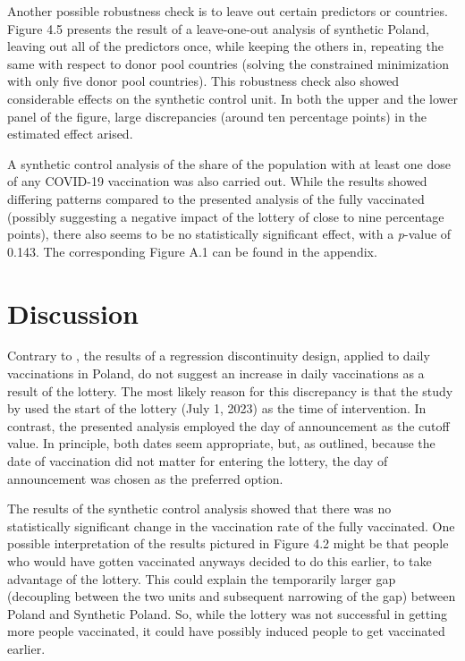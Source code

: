 \documentclass{scrbook}
\begin{document}
Another possible robustness check is to leave out certain predictors or
countries. Figure 4.5 presents the result of a leave-one-out analysis of
synthetic Poland, leaving out all of the predictors once, while keeping
the others in, repeating the same with respect to donor pool countries
(solving the constrained minimization with only five donor pool
countries). This robustness check also showed considerable effects on
the synthetic control unit. In both the upper and the lower panel of the
figure, large discrepancies (around ten percentage points) in the
estimated effect arised.

A synthetic control analysis of the share of the population with at
least one dose of any COVID-19 vaccination was also carried out. While
the results showed differing patterns compared to the presented analysis
of the fully vaccinated (possibly suggesting a negative impact of the
lottery of close to nine percentage points), there also seems to be no
statistically significant effect, with a \textit{p}-value of 0.143. The
corresponding Figure A.1 can be found in the appendix.

\chapter{Discussion}

Contrary to \textcite{kuznetsova_effectiveness_2022}, the results of a
regression discontinuity design, applied to daily vaccinations in
Poland, do not suggest an increase in daily vaccinations as a result of
the lottery. The most likely reason for this discrepancy is that the
study by \textcite{kuznetsova_effectiveness_2022} used the start of the
lottery (July 1, 2023) as the time of intervention. In contrast, the
presented analysis employed the day of announcement as the cutoff value.
In principle, both dates seem appropriate, but, as outlined, because the
date of vaccination did not matter for entering the lottery, the day of
announcement was chosen as the preferred option.

The results of the synthetic control analysis showed that there was no
statistically significant change in the vaccination rate of the fully
vaccinated. One possible interpretation of the results pictured in
Figure 4.2 might be that people who would have gotten vaccinated anyways
decided to do this earlier, to take advantage of the lottery. This could
explain the temporarily larger gap (decoupling between the two units and
subsequent narrowing of the gap) between Poland and Synthetic Poland.
So, while the lottery was not successful in getting more people
vaccinated, it could have possibly induced people to get vaccinated
earlier.
\end{document}
